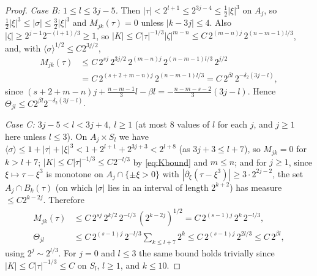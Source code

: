 \documentclass[10pt,reqno]{amsart}
\theoremstyle{remark}
\numberwithin{equation}{section}
\newcommand{\pd}{\partial}
\newcommand{\lan}{\langle}
\newcommand{\ran}{\rangle}
\newcommand{\sig}{\sigma}
\begin{document}
\begin{proof}
\emph{Case B: $1\le l\le3j-5$.} Then $|\tau|<2^{l+1}\le2^{3j-4}\le\frac12|\xi|^3$ on $A_j$, so $\frac12|\xi|^3\le|\sig|\le\frac32|\xi|^3$ and $M_{jk}(\tau)=0$ unless $|k-3j|\le4$. Also $|\zeta|\ge2^{j-1}2^{-(l+1)/3}\ge1$, so $|K|\le C|\tau|^{-1/3}|\zeta|^{m-n}\le C\,2^{(m-n)j}\,2^{(n-m-1)l/3}$, and, with $\lan\sig\ran^{1/2}\le C2^{3j/2}$,
\begin{equation*}\begin{split}M_{jk}(\tau)&\le C\,2^{sj}\,2^{3j/2}\,2^{(m-n)j}\,2^{(n-m-1)l/3}\,2^{j/2}\\&=C\,2^{(s+2+m-n)j}\,2^{(n-m-1)l/3}=C\,2^{\beta l}\,2^{-\delta_2(3j-l)},\end{split}\end{equation*}
since $(s+2+m-n)j+\frac{n-m-1}3l-\beta l=-\frac{n-m-s-2}3(3j-l)$. Hence $\Theta_{jl}\le C2^{\beta l}2^{-\delta_2(3j-l)}$.

\emph{Case C: $3j-5<l<3j+4$, $l\ge1$} (at most $8$ values of $l$ for each $j$, and $j\ge1$ here unless $l\le3$). On $A_j\times S_l$ we have $\lan\sig\ran\le1+|\tau|+|\xi|^3<1+2^{l+1}+2^{3j+3}<2^{l+8}$ (as $3j+3\le l+7$), so $M_{jk}=0$ for $k>l+7$; $|K|\le C|\tau|^{-1/3}\le C2^{-l/3}$ by \eqref{eq:Kbound} and $m\le n$; and for $j\ge1$, since $\xi\mapsto\tau-\xi^3$ is monotone on $A_j\cap\{\pm\xi>0\}$ with $|\pd_\xi(\tau-\xi^3)|\ge3\cdot2^{2j-2}$, the set $A_j\cap B_k(\tau)$ (on which $|\sig|$ lies in an interval of length $2^{k+2}$) has measure $\le C2^{k-2j}$. Therefore
\begin{equation*}\begin{split}M_{jk}(\tau)&\le C\,2^{sj}\,2^{k/2}\,2^{-l/3}\,(2^{k-2j})^{1/2}=C\,2^{(s-1)j}\,2^{k}\,2^{-l/3},\\
\Theta_{jl}&\le C\,2^{(s-1)j}\,2^{-l/3}\sum_{k\le l+7}2^k\le C\,2^{(s-1)j}\,2^{2l/3}\le C\,2^{\beta l},\end{split}\end{equation*}
using $2^j\sim2^{l/3}$. For $j=0$ and $l\le3$ the same bound holds trivially since $|K|\le C|\tau|^{-1/3}\le C$ on $S_l$, $l\ge1$, and $k\le 10$.


\end{proof}
\end{document}
